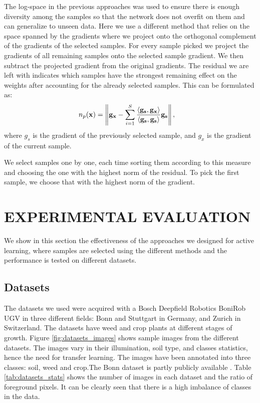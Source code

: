 \documentclass[letterpaper, 10 pt, conference]{ieeeconf}  %
\begin{document}
The log-space in the previous approaches was used to ensure there is enough diversity among the samples so that the network does not overfit on them and can generalize to unseen data. Here we use a different method that relies on the space spanned by the gradients where we project onto the orthogonal complement of the gradients of the selected samples. For every sample picked we project the gradients of all remaining samples onto the selected sample gradient. We then subtract the projected gradient from the original gradients. The residual we are left with indicates which samples have the strongest remaining effect on the weights after accounting for the already selected samples. This can be formulated as:
\begin{align}
n_p(\bold{x}) &=  \left\lVert \bold{g_x} - \sum_{i=1}^S \frac{\left\langle \bold{g_s}, \bold{g_x} \right\rangle}{\left\langle \bold{g_s}, \bold{g_s} \right\rangle} \bold{g_s} \right\rVert,
\end{align}
where $g_s$ is the gradient of the previously selected sample, and $g_x$ is the gradient of the current sample.

We select samples one by one, each time sorting them according to this measure and choosing the one with the highest norm of the residual. To pick the first sample, we choose that with the highest norm of the gradient.



\section{EXPERIMENTAL EVALUATION}
\label{sec:exp}


We show in this section the effectiveness of the approaches we designed for active learning, where samples are selected using the different methods and the performance is tested on different datasets. 


\subsection{Datasets}

The datasets we used were acquired with a Bosch Deepfield Robotics BoniRob UGV in three different fields: Bonn and Stuttgart in Germany, and Zurich in Switzerland. The datasets have weed and crop plants at different stages of growth. Figure \ref{fig:datasets_images} shows sample images from the different datasets. The images vary in their illumination, soil type, and classes statistics, hence the need for transfer learning. The images have been annotated into three classes: soil, weed and crop.The Bonn dataset is partly publicly available \cite{chebrolu2017agricultural}. Table \ref{tab:datasets_stats} shows the number of images in each dataset and the ratio of foreground pixels. It can be clearly seen that there is a high imbalance of classes in the data.
\end{document}
